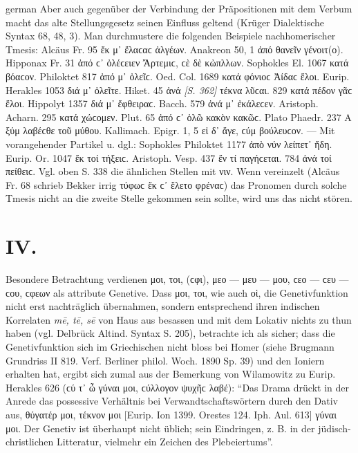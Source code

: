 \begin{otherlanguage*}{german}
\hspace*{-1mm}Aber auch gegenüber der Verbindung der Prä\-po\-si\-ti\-o\-nen mit dem Ver\-bum macht das alte Stellungsgesetz seinen Einfluss geltend (Krüger Dialektische Syntax 68, 48, 3). Man durchmustere die folgenden Beispiele nachhomerischer Tmesis: Alcäus Fr. 95 ἔκ μ᾽ ἔλαϲαϲ ἀλγέων. Anakreon 50, 1 ἀπό  θανεῖν γένοιτ(ο). Hipponax Fr. 31 ἀπό ϲ᾽ ὀλέϲειεν Ἄρτεμιϲ, ϲὲ δὲ κὠπλλων. Sophokles El. 1067 κατά  βόαϲον. Philoktet 817 ἀπό μ᾽ ὀλεῖϲ. Oed. Col. 1689 κατά  φόνιοϲ Ἀίδαϲ ἕλοι. Eurip. Herakles 1053 διά μ᾽ ὀλεῖτε. Hiket. 45 ἀνά \hypertarget{p362}{\emph{[S. 362]}}\label{p362}  τέκνα λῦϲαι. 829 κατά  πέδον γᾶϲ ἕλοι. Hippolyt 1357 διά μ᾽ ἔφθειραϲ. Bacch. 579 ἀνά μ᾽ ἐκάλεϲεν. Aristoph. Acharn. 295 κατά  χώϲομεν. Plut. 65 ἀπό ϲ᾽ ὀλῶ κακὸν κακῶϲ. Plato Phaedr. 237 Α ξύμ  λαβέϲθε τοῦ μύθου. Kallimach. Epigr. 1, 5 εἰ δ᾽ ἄγε, ϲύμ  βούλευϲον. — Mit vorangehender Partikel u. dgl.: Sophokles Philoktet 1177 ἀπὸ νύν  λείπετ᾽ ἤδη. Eurip. Or. 1047 ἔκ τοί  τήξειϲ. Aristoph. Vesp. 437 ἔν τί  παγήϲεται. 784 ἀνά τοί  πείθειϲ. Vgl. oben S. 338 die ähnlichen Stellen mit νιν. Wenn vereinzelt (Alcäus Fr. 68 schrieb Bekker irrig τύφωϲ ἔκ ϲ᾽ ἕλετο φρέναϲ) das Pronomen durch solche Tmesis nicht an die zweite Stelle gekommen sein sollte, wird uns das nicht stören.

\section*{IV.}

Besondere Betrachtung verdienen μοι, τοι, (ϲφι), μεο — μευ — μου, ϲεο — ϲευ — ϲου, ϲφεων als attribute Genetive. Dass μοι, τοι, wie auch οἱ, die Genetivfunktion nicht erst nachträglich übernahmen, sondern entsprechend ihren indischen Korrelaten \emph{mē, tē, sē} von Haus aus besassen und mit dem Lokativ nichts zu thun haben (vgl. Delbrück Altind. Syntax S. 205), betrachte ich als sicher; dass die Genetivfunktion sich im Griechischen nicht bloss bei Homer (siehe Brugmann Grundriss II 819. Verf. Berliner philol. Woch. 1890 Sp. 39) und den Ioniern erhalten hat, ergibt sich zumal aus der Bemerkung von Wilamowitz zu Eurip. Herakles 626 (ϲύ τ᾽ ὦ γύναι μοι, ϲύλλογον ψυχῆϲ λαβέ): “Das Drama drückt in der Anrede das possessive Verhältnis bei Verwandtschaftswörtern durch den Dativ aus, θύγατέρ μοι, τέκνον μοι [Eurip. Ion 1399. Orestes 124. Iph. Aul. 613] γύναι μοι. Der Genetiv ist überhaupt nicht üblich; sein Eindringen, z. B. in der jüdisch-christlichen Litteratur, vielmehr ein Zeichen des Plebeiertums”.


\end{otherlanguage*}
